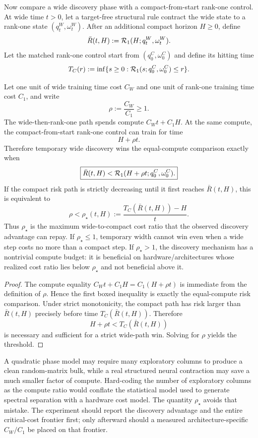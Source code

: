 Now compare a wide discovery phase with a compact-from-start rank-one control. At wide time $t>0$, let a target-free structural rule contract the wide state to a rank-one state $(q_t^W,\omega_t^W)$. After an additional compact horizon $H\ge0$, define
\[
\bar R(t,H)
:=\mathcal R_1(H;q_t^W,\omega_t^W).
\]
Let the matched rank-one control start from $(q_0^C,\omega_0^C)$ and define its hitting time
\[
T_C(r)
:=\inf\{s\ge0:\mathcal R_1(s;q_0^C,\omega_0^C)\le r\}.
\]

\begin{theorem}\label{thm:rankone-critical-compute}
Let one unit of wide training time cost $C_W$ and one unit of rank-one training time cost $C_1$, and write
\[
\rho:=\frac{C_W}{C_1}\ge1.
\]
The wide-then-rank-one path spends compute $C_Wt+C_1H$. At the same compute, the compact-from-start rank-one control can train for time
\[
H+\rho t.
\]
Therefore temporary wide discovery wins the equal-compute comparison exactly when
\[
\boxed{
\bar R(t,H)
<
\mathcal R_1(H+\rho t;q_0^C,\omega_0^C).}
\]
If the compact risk path is strictly decreasing until it first reaches $\bar R(t,H)$, this is equivalent to
\[
\boxed{
\rho<\rho_\star(t,H)
:=\frac{T_C(\bar R(t,H))-H}{t}.}
\]
Thus $\rho_\star$ is the maximum wide-to-compact cost ratio that the observed discovery advantage can repay. If $\rho_\star\le1$, temporary width cannot win even when a wide step costs no more than a compact step. If $\rho_\star>1$, the discovery mechanism has a nontrivial compute budget: it is beneficial on hardware/architectures whose realized cost ratio lies below $\rho_\star$ and not beneficial above it.
\end{theorem}

\begin{proof}
The compute equality
$C_Wt+C_1H=C_1(H+\rho t)$
is immediate from the definition of $\rho$. Hence the first boxed inequality is exactly the equal-compute risk comparison. Under strict monotonicity, the compact path has risk larger than $\bar R(t,H)$ precisely before time $T_C(\bar R(t,H))$. Therefore
\[
H+\rho t<T_C(\bar R(t,H))
\]
is necessary and sufficient for a strict wide-path win. Solving for $\rho$ yields the threshold.
\end{proof}

\begin{remark}
A quadratic phase model may require many exploratory columns to produce a clean random-matrix bulk, while a real structured neural contraction may save a much smaller factor of compute. Hard-coding the number of exploratory columns as the compute ratio would conflate the statistical model used to generate spectral separation with a hardware cost model. The quantity $\rho_\star$ avoids that mistake. The experiment should report the discovery advantage and the entire critical-cost frontier first; only afterward should a measured architecture-specific $C_W/C_1$ be placed on that frontier.
\end{remark}
